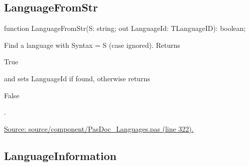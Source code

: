 \documentclass{report}
\newif\ifpdf
\begin{document}
\subsection*{LanguageFromStr}
\fi
\label{PasDoc_Languages-LanguageFromStr}
\begin{list}{}{
\setlength{\itemindent}{0cm}
\setlength{\listparindent}{0cm}
\setlength{\leftmargin}{\evensidemargin}
\addtolength{\leftmargin}{\tmplength}
\settowidth{\labelsep}{X}
\addtolength{\leftmargin}{\labelsep}
\setlength{\labelwidth}{\tmplength}
}
\item[\textbf{Declaration}\hfill]
\ifpdf
\begin{flushleft}
\fi
\begin{ttfamily}
function LanguageFromStr(S: string; out LanguageId: TLanguageID): boolean;\end{ttfamily}

\ifpdf
\end{flushleft}
\fi

\par
\item[\textbf{Description}]
Find a language with Syntax = S (case ignored). Returns \begin{ttfamily}True\end{ttfamily} and sets LanguageId if found, otherwise returns \begin{ttfamily}False\end{ttfamily}.\par
\href{https://github.com/pasdoc/pasdoc/blob/master/source/component/PasDoc_Languages.pas#L322}{Source: source/component/PasDoc{\_}Languages.pas (line 322).}

\end{list}
\ifpdf
\subsection*{\large{\textbf{LanguageInformation}}\normalsize\hspace{1ex}\hrulefill}
\else
\end{document}
